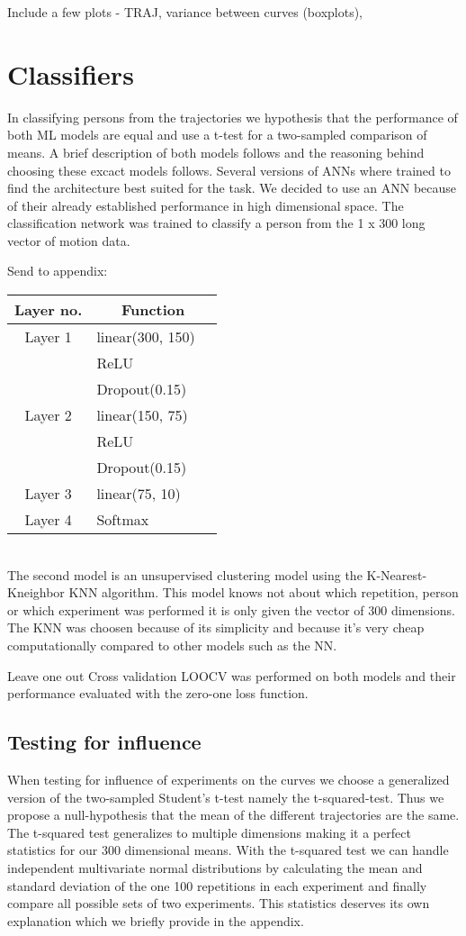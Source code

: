 \documentclass{article}
\begin{document}
Include a few plots - TRAJ, variance between curves (boxplots), 

\section{Classifiers}
In classifying persons from the trajectories we hypothesis that the performance of both ML models are equal and use a t-test for a two-sampled comparison of means. A brief description of both models follows and the reasoning behind choosing these excact models follows.
Several versions of ANNs where trained to find the  architecture best suited for the task. We decided to use an ANN because of their already established performance in high dimensional space. The classification network was trained to classify a person from the 1 x 300 long vector of motion data.   

Send to appendix:
\begin{tabular}[H]{c l @{} l}
\centering
Layer no.       &
\multicolumn{2}{c}{Function} \\
\hline
Layer 1     & linear(300, 150) \\
            & ReLU \\
            & Dropout(0.15) \\
Layer 2     & linear(150, 75) \\ 
            & ReLU \\
            & Dropout(0.15) \\
Layer 3     & linear(75, 10) \\ 
Layer 4     & Softmax\\ 
\end{tabular}\\ 


The second model is an unsupervised clustering model using the K-Nearest-Kneighbor KNN algorithm. This model knows not about which repetition, person or which experiment was performed it is only given the vector of 300 dimensions. 
The KNN was choosen because of its simplicity and because it's very cheap computationally compared to other models such as the NN.

Leave one out Cross validation LOOCV was performed on both models and their performance evaluated with the zero-one loss function.


\subsection{Testing for influence}
When testing for influence of experiments on the curves we choose a  generalized version of the two-sampled Student's t-test namely the t-squared-test. Thus we propose a null-hypothesis that the mean of the different trajectories are the same. The t-squared test generalizes to multiple dimensions making it a perfect statistics for our 300 dimensional means. With the t-squared test we can handle independent multivariate normal distributions by calculating the mean and standard deviation of the one 100 repetitions in each experiment and finally compare all possible sets of two experiments. This statistics deserves its own explanation which we briefly provide in the appendix.
\end{document}
